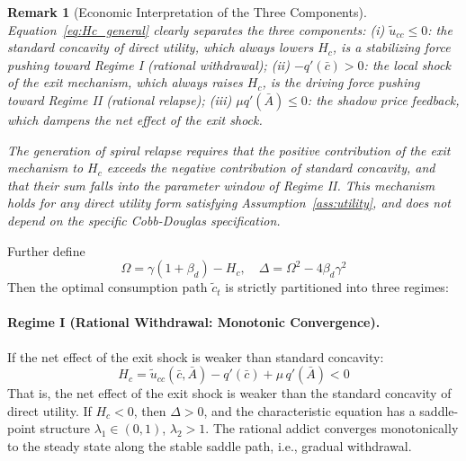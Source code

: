 \documentclass[12pt]{article}
\newtheorem{remark}{Remark}
\begin{document}
\begin{remark}[Economic Interpretation of the Three Components]
Equation~\eqref{eq:Hc_general} clearly separates the three components:
(i) $\tilde{u}_{cc} \leq 0$: the standard concavity of direct utility, which always lowers $H_c$,
is a stabilizing force pushing toward Regime I (rational withdrawal);
(ii) $-q'(\bar{c}) > 0$: the local shock of the exit mechanism, which always raises $H_c$,
is the driving force pushing toward Regime II (rational relapse);
(iii) $\mu q'(\bar{A}) \leq 0$: the shadow price feedback, which dampens the net effect of the exit shock.
 
The generation of spiral relapse requires that the positive contribution of the exit mechanism to $H_c$ exceeds the negative contribution of standard concavity,
and that their sum falls into the parameter window of Regime II. This mechanism holds for any direct utility form satisfying Assumption~\ref{ass:utility},
and does not depend on the specific Cobb-Douglas specification.
\end{remark}
Further define
\begin{equation}\label{eq:OmegaDelta}
\Omega = \gamma(1+\beta_d) - H_c, \quad
\Delta = \Omega^2 - 4\beta_d\gamma^2
\end{equation}
Then the optimal consumption path $\tilde{c}_t$ is strictly partitioned into three regimes:

\paragraph{Regime I (Rational Withdrawal: Monotonic Convergence).} If the net effect of the exit shock is weaker than standard concavity:
\begin{equation}\label{eq:regime1}
H_c = \tilde{u}_{cc}(\bar{c},\bar{A}) - q'(\bar{c}) + \mu\,q'(\bar{A}) < 0
\end{equation}
That is, the net effect of the exit shock is weaker than the standard concavity of direct utility.
If $H_c < 0$, then $\Delta > 0$, and the characteristic equation has a saddle-point structure $\lambda_1 \in (0,1)$, $\lambda_2 > 1$.
The rational addict converges monotonically to the steady state along the stable saddle path, i.e., gradual withdrawal.
\end{document}
